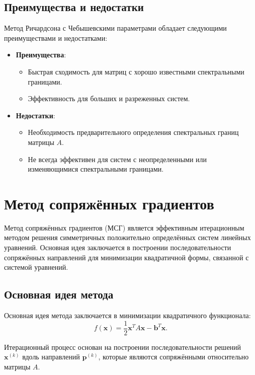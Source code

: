 \documentclass{article}
\begin{document}
\subsection*{Преимущества и недостатки}

Метод Ричардсона с Чебышевскими параметрами обладает следующими преимуществами и недостатками:

\begin{itemize}
    \item \textbf{Преимущества}:
    \begin{itemize}
        \item Быстрая сходимость для матриц с хорошо известными спектральными границами.
        \item Эффективность для больших и разреженных систем.
    \end{itemize}
    \item \textbf{Недостатки}:
    \begin{itemize}
        \item Необходимость предварительного определения спектральных границ матрицы \(A\).
        \item Не всегда эффективен для систем с неопределенными или изменяющимися спектральными границами.
    \end{itemize}
\end{itemize}


\section{Метод сопряжённых градиентов}
Метод сопряжённых градиентов (МСГ) является эффективным итерационным методом решения симметричных положительно определённых систем линейных уравнений. Основная идея заключается в построении последовательности сопряжённых направлений для минимизации квадратичной формы, связанной с системой уравнений.

\subsection*{Основная идея метода}

Основная идея метода заключается в минимизации квадратичного функционала:
\[
f(\mathbf{x}) = \frac{1}{2} \mathbf{x}^T A \mathbf{x} - \mathbf{b}^T \mathbf{x}.
\]

Итерационный процесс основан на построении последовательности решений \(\mathbf{x}^{(k)}\) вдоль направлений \(\mathbf{p}^{(k)}\), которые являются сопряжёнными относительно матрицы \(A\).
\end{document}
